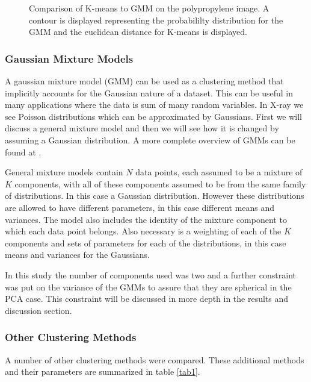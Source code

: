 \documentclass[a4paper,11pt]{article}
\begin{document}
\begin{figure}[t!]
    \caption{Comparison of K-means to GMM on the polypropylene image. A contour is displayed representing the probabililty distribution for the GMM and the euclidean distance for K-means is displayed.}
    \label{clustering_methods}
\end{figure}

\subsubsection{Gaussian Mixture Models}

A gaussian mixture model (GMM) can be used as a clustering method that implicitly accounts for the Gaussian nature of a dataset. This can be useful in many applications where the data is sum of many random variables. In X-ray we see Poisson distributions which can be approximated by Gaussians. First we will discuss a general mixture model and then we will see how it is changed by assuming a Gaussian distribution. A more complete overview of GMMs can be found at \cite{DinovExpectationTutorial}.

General mixture models contain $N$ data points, each assumed to be a mixture of $K$ components, with all of these components assumed to be from the same family of distributions. In this case a Gaussian distribution. However these distributions are allowed to have different parameters, in this case different means and variances. The model also includes the identity of the mixture component to which each data point belongs. Also necessary is a weighting of each of the $K$ components and sets of parameters for each of the distributions, in this case means and variances for the Gaussians.

In this study the number of components used was two and a further constraint was put on the variance of the GMMs to assure that they are spherical in the PCA case. This constraint will be discussed in more depth in the results and discussion section.

\subsubsection{Other Clustering Methods}

A number of other clustering methods were compared. These additional methods and their parameters are summarized in table \ref{tab1}.
\end{document}
